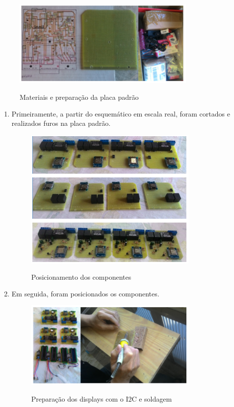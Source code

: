 \begin{figure}[H]
	\centering
	\caption{Materiais e preparação da placa padrão}
	\includegraphics[width=0.8\textwidth]{materiaisPrepPlaca}
	\label{fig:materiaisPrepPlaca}
\end{figure}

\begin{enumerate}
	\item Primeiramente, a partir do esquemático em escala real, foram cortados e realizados furos na placa padrão.

	\begin{figure}[H]
		\centering
		\caption{Posicionamento dos componentes}
		\includegraphics[width=0.8\textwidth]{PosicionamentoComp}
		\label{fig:PosicionamentoComp}
	\end{figure}

	\item Em seguida, foram posicionados os componentes.

	\begin{figure}[H]
		\centering
		\caption{Preparação dos displays com o I2C e soldagem}
		\includegraphics[width=0.8\textwidth]{PrepI2CSoldagem}
		\label{fig:PrepI2CSoldagem}
	\end{figure}


\end{enumerate}
